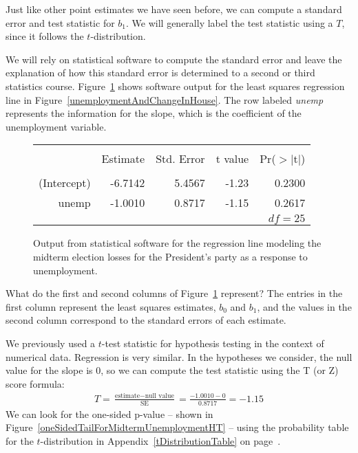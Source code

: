 Just like other point estimates we have seen before, we can compute a standard error and test statistic for $b_1$. We will generally label the test statistic using a $T$, since it follows the $t$-distribution.

We will rely on statistical software to compute the standard error and leave the explanation of how this standard error is determined to a second or third statistics course. Figure~\ref{midtermElectionUnemploymentRRegressionOutput} shows software output for the least squares regression line in Figure~\ref{unemploymentAndChangeInHouse}. The row labeled \emph{unemp} represents the information for the slope, which is the coefficient of the unemployment variable.

\begin{figure}[ht]
\centering
\begin{tabular}{rrrrr}
  \hline
  \vspace{-3.7mm} & & & & \\
 & Estimate & Std. Error & t value & Pr($>$$|$t$|$) \\ 
  \hline
  \vspace{-3.6mm} & & & & \\
(Intercept) & -6.7142 & 5.4567 & -1.23 & 0.2300 \\ 
  unemp & -1.0010 & 0.8717 & -1.15 & 0.2617 \\ 
   \hline
   \multicolumn{5}{r}{$df=25$} \\
\end{tabular}
\caption{Output from statistical software for the regression line modeling the midterm election losses for the President's party as a response to unemployment.}
\label{midtermElectionUnemploymentRRegressionOutput}
\end{figure}

\begin{example}{What do the first and second columns of Figure~\ref{midtermElectionUnemploymentRRegressionOutput} represent?}
The entries in the first column represent the least squares estimates, $b_0$ and $b_1$, and the values in the second column correspond to the standard errors of each estimate.
\end{example}

We previously used a $t$-test statistic for hypothesis testing in the context of numerical data. Regression is very similar. In the hypotheses we consider, the null value for the slope is 0, so we can compute the test statistic using the T (or Z) score formula:
\begin{align*}
T = \frac{\text{estimate} - \text{null value}}{\text{SE}} = \frac{-1.0010 - 0}{0.8717} = -1.15
\end{align*}
We can look for the one-sided p-value -- shown in Figure~\ref{oneSidedTailForMidtermUnemploymentHT} -- using the probability table for the $t$-distribution in Appendix~\ref{tDistributionTable} on page~\pageref{tDistributionTable}.

